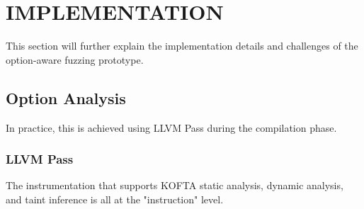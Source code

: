 \iftrue
\section{IMPLEMENTATION}
\label{ch:implementation}

This section will further explain the implementation details and challenges of the option-aware fuzzing prototype.
\fi

\iftrue

\subsection{Option Analysis} %

In practice, this is achieved using LLVM Pass during the compilation phase.

\subsubsection{LLVM Pass}
\label{subsec:llvm-pass}

%
The instrumentation that supports KOFTA static analysis, dynamic analysis, and taint inference is all at the "instruction" level.


